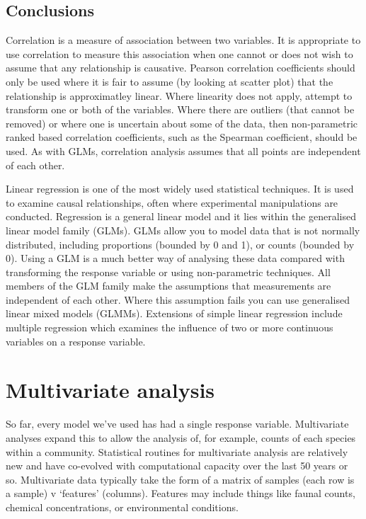 \documentclass[
  11pt,
  a4paper,
]{book}
\begin{document}
\hypertarget{conclusions-4}{%
\section{Conclusions}\label{conclusions-4}}

Correlation is a measure of association between two variables. It is appropriate to use correlation to measure this association when one cannot or does not wish to assume that any relationship is causative. Pearson correlation coefficients should only be used where it is fair to assume (by looking at scatter plot) that the relationship is approximatley linear. Where linearity does not apply, attempt to transform one or both of the variables. Where there are outliers (that cannot be removed) or where one is uncertain about some of the data, then non-parametric ranked based correlation coefficients, such as the Spearman coefficient, should be used. As with GLMs, correlation analysis assumes that all points are independent of each other.

Linear regression is one of the most widely used statistical techniques. It is used to examine causal relationships, often where experimental manipulations are conducted. Regression is a general linear model and it lies within the generalised linear model family (GLMs). GLMs allow you to model data that is not normally distributed, including proportions (bounded by 0 and 1), or counts (bounded by 0). Using a GLM is a much better way of analysing these data compared with transforming the response variable or using non-parametric techniques. All members of the GLM family make the assumptions that measurements are independent of each other. Where this assumption fails you can use generalised linear mixed models (GLMMs). Extensions of simple linear regression include multiple regression which examines the influence of two or more continuous variables on a response variable.

\hypertarget{multivariate}{%
\chapter{Multivariate analysis}\label{multivariate}}

So far, every model we've used has had a single response variable. Multivariate analyses expand this to allow the analysis of, for example, counts of each species within a community. Statistical routines for multivariate analysis are relatively new and have co-evolved with computational capacity over the last 50 years or so. Multivariate data typically take the form of a matrix of samples (each row is a sample) v `features' (columns). Features may include things like faunal counts, chemical concentrations, or environmental conditions.
\end{document}
